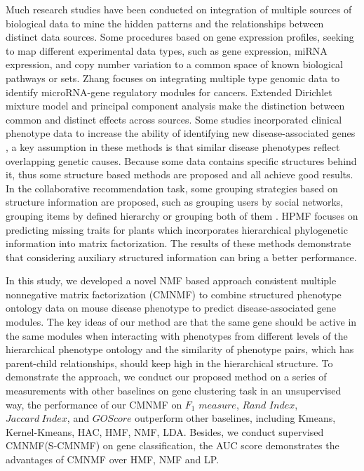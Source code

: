 \documentclass{bmcart}
\begin{document}
Much research studies have been conducted on integration of multiple sources of biological data to mine the hidden patterns and the relationships between distinct data sources. Some procedures based on gene expression profiles, seeking to map different experimental data types, such as gene expression, miRNA expression, and copy number variation to a common space of known biological pathways or sets\cite{Khatri2012,Mitrea2013}. Zhang\cite{Zhang2011} focuses on integrating multiple type genomic data to identify microRNA-gene regulatory modules for cancers. Extended Dirichlet mixture model\cite{Lock2013} and principal component analysis\cite{Lock2013a} make the distinction between common and distinct effects across sources. Some studies incorporated clinical phenotype data to increase the ability of identifying new disease-associated genes\cite{Hwang2012,Lage2007,Li2010,Vanunu2010,Wu2008a,Wu2008b}
, a key assumption in these methods is that  similar disease phenotypes reflect overlapping genetic causes\cite{Houle2010}.
 Because some data contains specific structures behind it, thus some structure based methods are proposed and all achieve good results. In the collaborative recommendation task, some grouping strategies based on structure information are proposed, such as grouping users by social networks, grouping items by defined hierarchy or grouping both of them \cite{Wang2014,Ma2008,AliMashhoori2012}. HPMF\cite{Shan2012} focuses on predicting missing traits for plants which incorporates hierarchical phylogenetic information into matrix factorization. The results of these methods demonstrate that considering auxiliary structured information can bring a better performance.

In this study, we developed a novel NMF based approach consistent multiple nonnegative matrix factorization (CMNMF) to combine structured phenotype ontology data on mouse disease phenotype to predict disease-associated gene modules. The key ideas of our method are that the same gene should be active in the same modules when interacting with phenotypes from different levels of the hierarchical phenotype ontology  and the similarity of phenotype pairs, which has parent-child relationships, should keep high in the hierarchical structure. To demonstrate the approach, we conduct our proposed method on a series of measurements with other baselines on gene clustering task in an unsupervised way, the performance of our CMNMF on $F_1$ $measure$, $Rand$ $Index$, $Jaccard\ Index$, and $GO Score$ outperform other baselines, including Kmeans, Kernel-Kmeans, HAC, HMF\cite{AliMashhoori2012}, NMF\cite{Lee1999}, LDA\cite{Blei2003}. Besides, we conduct supervised CMNMF(S-CMNMF) on gene classification, the AUC score demonstrates the advantages of CMNMF over HMF, NMF and LP\cite{Raghavan2007}.
\end{document}
